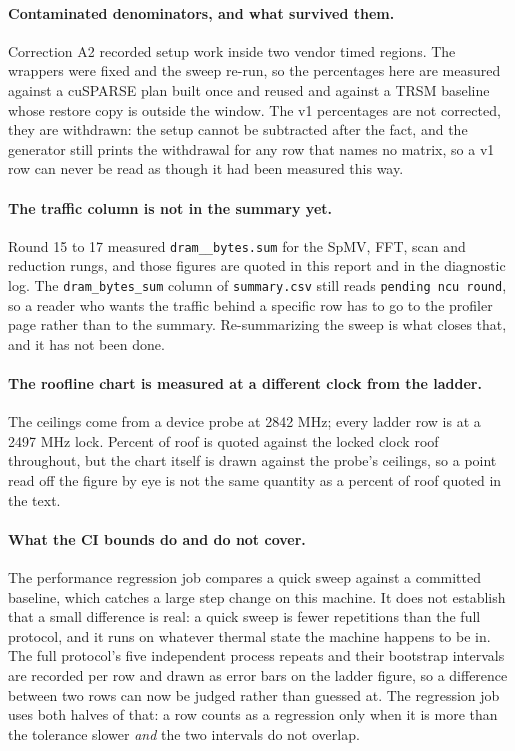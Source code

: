 \paragraph{Contaminated denominators, and what survived them.} Correction A2
recorded setup work inside two vendor timed regions. The wrappers were fixed and
the sweep re-run, so the percentages here are measured against a cuSPARSE plan
built once and reused and against a TRSM baseline whose restore copy is outside the
window. The v1 percentages are not corrected, they are withdrawn: the setup cannot
be subtracted after the fact, and the generator still prints the withdrawal for any
row that names no matrix, so a v1 row can never be read as though it had been
measured this way.

\paragraph{The traffic column is not in the summary yet.} Round 15 to 17 measured
\texttt{dram\_\_bytes.sum} for the SpMV, FFT, scan and reduction rungs, and those
figures are quoted in this report and in the diagnostic log. The
\texttt{dram\_bytes\_sum} column of \texttt{summary.csv} still reads
\texttt{pending ncu round}, so a reader who wants the traffic behind a specific row
has to go to the profiler page rather than to the summary. Re-summarizing the sweep
is what closes that, and it has not been done.

\paragraph{The roofline chart is measured at a different clock from the ladder.}
The ceilings come from a device probe at 2842 MHz; every ladder row is at a 2497
MHz lock. Percent of roof is quoted against the locked clock roof throughout, but
the chart itself is drawn against the probe's ceilings, so a point read off the
figure by eye is not the same quantity as a percent of roof quoted in the text.

\paragraph{What the CI bounds do and do not cover.} The performance regression job
compares a quick sweep against a committed baseline, which catches a large step
change on this machine. It does not establish that a small difference is real: a
quick sweep is fewer repetitions than the full protocol, and it runs on whatever
thermal state the machine happens to be in. The full protocol's five independent
process repeats and their bootstrap intervals are recorded per row and drawn as
error bars on the ladder figure, so a difference between two rows can now be judged
rather than guessed at. The regression job uses both halves of that: a row counts
as a regression only when it is more than the tolerance slower \emph{and} the two
intervals do not overlap.

